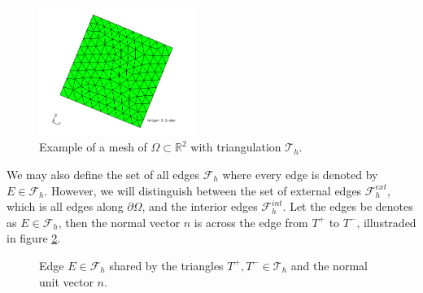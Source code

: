 \begin{figure}[!h]
    \centering
    \includegraphics[width=0.45\textwidth]{figures/mesh.jpg}
    \caption{Example of a mesh of $\Omega \subset \mathbb{R} ^{2}$ with triangulation $\mathcal{T} _{h}$.    }
    \label{fig:mesh_example}
\end{figure}

We may also define the set of all edges $\mathcal{F}_{h}$ where every edge is denoted by $E \in \mathcal{F} _{h}$. However, we will distinguish between the
set of external edges $\mathcal{F}^{ext} _{h}$, which is all edges along $\partial \Omega $, and the interior edges $\mathcal{F} ^{int}_{h}$. Let the edges be denotes as $E \in \mathcal{F } _{h}$, then the normal vector $n$ is across the edge from
$T^{+}$ to $T^{-}$, illustraded in figure \ref{fig:normal}.

\begin{figure}[!h]
\centering
{}
\caption{Edge $E \in \mathcal{F}_h $ shared by the triangles $T^{+}, T^{-} \in \mathcal{T}_{h} $ and the normal unit vector $n$.  }
    \label{fig:normal}
\end{figure}



